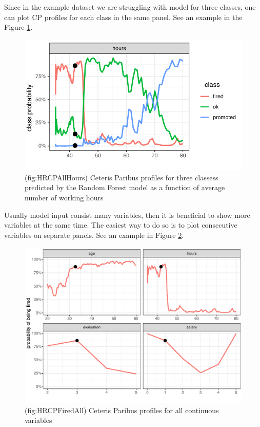 \documentclass[]{book}
\theoremstyle{definition}
\theoremstyle{definition}
\theoremstyle{definition}
\theoremstyle{remark}
\begin{document}
Since in the example dataset we are struggling with model for three
classes, one can plot CP profiles for each class in the same panel. See
an example in the Figure \ref{fig:HRCPAllHours}.

\begin{figure}

{\centering \includegraphics[width=0.6\linewidth]{figure/HR_cp_all_hours} 

}

\caption{(fig:HRCPAllHours) Ceteris Paribus profiles for three classess predicted by the Random Forest model as a function of average number of working hours}\label{fig:HRCPAllHours}
\end{figure}

Usually model input consist many variables, then it is beneficial to
show more variables at the same time. The easiest way to do so is to
plot consecutive variables on separate panels. See an example in Figure
\ref{fig:HRCPFiredAll}.

\begin{figure}

{\centering \includegraphics[width=0.7\linewidth]{figure/HR_cp_fired_all} 

}

\caption{(fig:HRCPFiredAll) Ceteris Paribus profiles for all continuous variables}\label{fig:HRCPFiredAll}
\end{figure}
\end{document}
